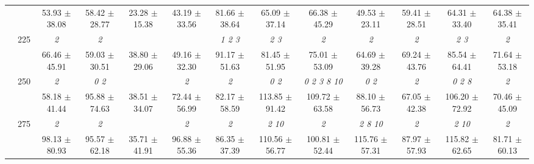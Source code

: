 \begin{table}[h]
{\begin{tabular}{
        ccccccccccccc}
 & & 53.93 $\pm$ 38.08& 58.42 $\pm$ 28.77& 23.28 $\pm$ 15.38& 43.19 $\pm$ 33.56& 81.66 $\pm$ 38.64& 65.09 $\pm$ 37.14& 66.38 $\pm$ 45.29& 49.53 $\pm$ 23.11& 59.41 $\pm$ 28.51& 64.31 $\pm$ 33.40& 64.38 $\pm$ 35.41 \\ 
 & \multirow{2}{*}{225}& \cellcolor[HTML]{EFEFEF} \textit{ 2 }& \cellcolor[HTML]{EFEFEF} \textit{ 2 }& \cellcolor[HTML]{EFEFEF} & \cellcolor[HTML]{EFEFEF} & \cellcolor[HTML]{EFEFEF} \textit{ 1 2 3 }& \cellcolor[HTML]{EFEFEF} \textit{ 2 3 }& \cellcolor[HTML]{EFEFEF} \textit{ 2 }& \cellcolor[HTML]{EFEFEF} \textit{ 2 }& \cellcolor[HTML]{EFEFEF} \textit{ 2 }& \cellcolor[HTML]{EFEFEF} \textit{ 2 3 }& \cellcolor[HTML]{EFEFEF} \textit{ 2 } \\ 
 & & \cellcolor[HTML]{EFEFEF} 66.46 $\pm$ 45.91& \cellcolor[HTML]{EFEFEF} 59.03 $\pm$ 30.51& \cellcolor[HTML]{EFEFEF} 38.80 $\pm$ 29.06& \cellcolor[HTML]{EFEFEF} 49.16 $\pm$ 32.30& \cellcolor[HTML]{EFEFEF} 91.17 $\pm$ 51.63& \cellcolor[HTML]{EFEFEF} 81.45 $\pm$ 51.95& \cellcolor[HTML]{EFEFEF} 75.01 $\pm$ 53.09& \cellcolor[HTML]{EFEFEF} 64.69 $\pm$ 39.28& \cellcolor[HTML]{EFEFEF} 69.24 $\pm$ 43.76& \cellcolor[HTML]{EFEFEF} 85.54 $\pm$ 64.41& \cellcolor[HTML]{EFEFEF} 71.64 $\pm$ 53.18 \\ 
 & \multirow{2}{*}{250}& \textit{ 2 }& \textit{ 0 2 }& & \textit{ 2 }& \textit{ 2 }& \textit{ 0 2 }& \textit{  0  2  3  8 10 }& \textit{ 0 2 }& \textit{ 2 }& \textit{ 0 2 8 }& \textit{ 2 } \\ 
 & & 58.18 $\pm$ 41.44& 95.88 $\pm$ 74.63& 38.51 $\pm$ 34.07& 72.44 $\pm$ 56.99& 82.17 $\pm$ 58.59& 113.85 $\pm$ 91.42& 109.72 $\pm$ 63.58& 88.10 $\pm$ 56.73& 67.05 $\pm$ 42.38& 106.20 $\pm$ 72.92& 70.46 $\pm$ 45.09 \\ 
 & \multirow{2}{*}{275}& \cellcolor[HTML]{EFEFEF} \textit{ 2 }& \cellcolor[HTML]{EFEFEF} \textit{ 2 }& \cellcolor[HTML]{EFEFEF} & \cellcolor[HTML]{EFEFEF} \textit{ 2 }& \cellcolor[HTML]{EFEFEF} \textit{ 2 }& \cellcolor[HTML]{EFEFEF} \textit{  2 10 }& \cellcolor[HTML]{EFEFEF} \textit{ 2 }& \cellcolor[HTML]{EFEFEF} \textit{  2  8 10 }& \cellcolor[HTML]{EFEFEF} \textit{ 2 }& \cellcolor[HTML]{EFEFEF} \textit{  2 10 }& \cellcolor[HTML]{EFEFEF} \textit{ 2 } \\ 
 & & \cellcolor[HTML]{EFEFEF} 98.13 $\pm$ 80.93& \cellcolor[HTML]{EFEFEF} 95.57 $\pm$ 62.18& \cellcolor[HTML]{EFEFEF} 35.71 $\pm$ 41.91& \cellcolor[HTML]{EFEFEF} 96.88 $\pm$ 55.36& \cellcolor[HTML]{EFEFEF} 86.35 $\pm$ 37.39& \cellcolor[HTML]{EFEFEF} 110.56 $\pm$ 56.77& \cellcolor[HTML]{EFEFEF} 100.81 $\pm$ 52.44& \cellcolor[HTML]{EFEFEF} 115.76 $\pm$ 57.31& \cellcolor[HTML]{EFEFEF} 87.97 $\pm$ 57.93& \cellcolor[HTML]{EFEFEF} 115.82 $\pm$ 62.65& \cellcolor[HTML]{EFEFEF} 81.71 $\pm$ 60.13 \\ 

\end{tabular}}
\end{table}
